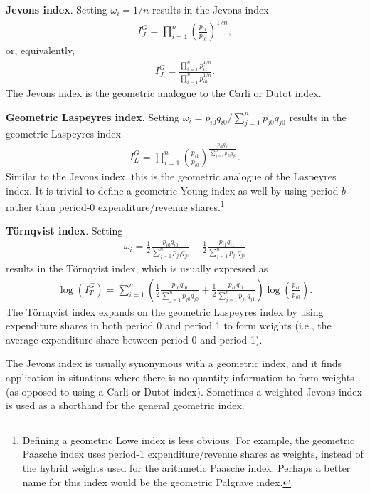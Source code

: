 \documentclass[]{article}
\begin{document}
\textbf{Jevons index}. Setting \(\omega_{i} = 1 / n\) results in the Jevons index
\begin{align*}
I^{G}_{J} = \prod_{i = 1}^{n} \left(\frac{p_{i1}}{p_{i0}}\right)^{1 / n},
\end{align*}
or, equivalently,
\begin{align*}
I^{G}_{J} = \frac{\prod_{i = 1}^{n} p_{i1}^{1 / n}}{\prod_{i = 1}^{n} p_{i0}^{1 / n}}.
\end{align*}
The Jevons index is the geometric analogue to the Carli or Dutot index.

\textbf{Geometric Laspeyres index}. Setting \(\omega_{i} = p_{i0} q_{i0} / \sum_{j = 1}^{n} p_{j0} q_{j0}\) results in the geometric Laspeyres index
\begin{align*}
I^{G}_{L} = \prod_{i = 1}^{n} \left(\frac{p_{i1}}{p_{i0}}\right)^{\frac{p_{i0} q_{i0}}{\sum_{j = 1}^{n} p_{j0} q_{j0}}}.
\end{align*}
Similar to the Jevons index, this is the geometric analogue of the Laspeyres index. It is trivial to define a geometric Young index as well by using period-\(b\) rather than period-0 expenditure/revenue shares.\footnote{Defining a geometric Lowe index is less obvious. For example, the geometric Paasche index uses period-1 expenditure/revenue shares as weights, instead of the hybrid weights used for the arithmetic Paasche index. Perhaps a better name for this index would be the geometric Palgrave index.}

\textbf{Törnqvist index}. Setting
\begin{align*}
\omega_{i} = \frac{1}{2} \frac{p_{i0} q_{i0}}{\sum_{j = 1}^{n} p_{j0} q_{j0}} + \frac{1}{2} \frac{p_{i1} q_{i1}}{\sum_{j = 1}^{n} p_{j1} q_{j1}}
\end{align*}
results in the Törnqvist index, which is usually expressed as
\begin{align*}
\log(I^{G}_{T}) = \sum_{i = 1}^{n} \left(\frac{1}{2} \frac{p_{i0} q_{i0}}{\sum_{j = 1}^{n} p_{j0} q_{j0}} + \frac{1}{2} \frac{p_{i1} q_{i1}}{\sum_{j = 1}^{n} p_{j1} q_{j1}}\right) \log\left(\frac{p_{i1}}{p_{i0}}\right).
\end{align*}
The Törnqvist index expands on the geometric Laspeyres index by using expenditure shares in both period 0 and period 1 to form weights (i.e., the average expenditure share between period 0 and period 1).

The Jevons index is usually synonymous with a geometric index, and it finds application in situations where there is no quantity information to form weights (as opposed to using a Carli or Dutot index). Sometimes a weighted Jevons index is used as a shorthand for the general geometric index.
\end{document}
